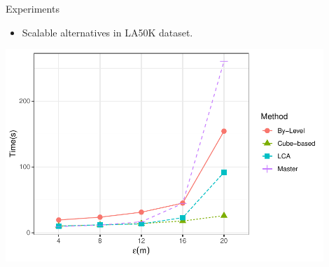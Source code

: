 \begin{frame}{Experiments}
    \begin{itemize}
        \item Scalable alternatives in LA50K dataset.
    \end{itemize} \vspace{0.25cm}

    \centering
    \includegraphics[width=0.9\textwidth]
            {../thesis/chapterPFlocks/figures/plots/08_sequential_parallel/la50k_e}
\end{frame}
